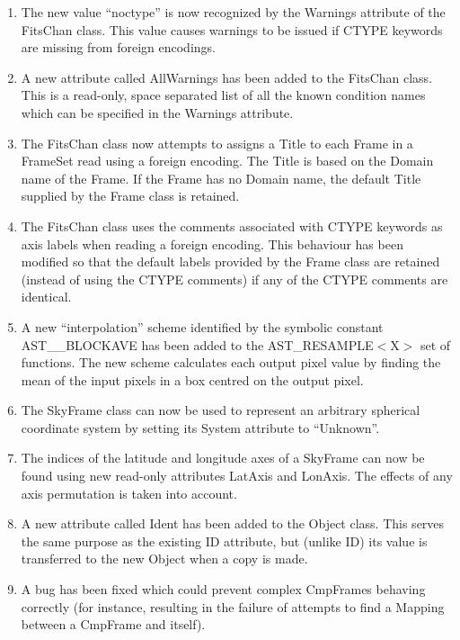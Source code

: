 \documentclass[twoside,11pt]{article}
\begin{document}
\begin{enumerate}
\item The new value ``noctype'' is now recognized by the Warnings attribute 
of the FitsChan class. This value causes warnings to be issued if CTYPE
keywords are missing from foreign encodings.

\item A new attribute called AllWarnings has been added to the FitsChan 
class. This is a read-only, space separated list of all the known condition 
names which can be specified in the Warnings attribute.

\item The FitsChan class now attempts to assigns a Title to each Frame in
a FrameSet read using a foreign encoding. The Title is based on the Domain
name of the Frame. If the Frame has no Domain name, the default Title
supplied by the Frame class is retained.

\item The FitsChan class uses the comments associated with CTYPE
keywords as axis labels when reading a foreign encoding. This behaviour 
has been modified so that the default labels provided by the Frame class
are retained (instead of using the CTYPE comments) if any of the CTYPE 
comments are identical.

\item A new ``interpolation'' scheme identified by the symbolic constant
AST\_\_BLOCKAVE has been added to the AST\_RESAMPLE$<$X$>$ set of
functions. The new scheme calculates each output pixel value by finding
the mean of the input pixels in a box centred on the output pixel.

\item The SkyFrame class can now be used to represent an arbitrary spherical
coordinate system by setting its System attribute to ``Unknown''.

\item The indices of the latitude and longitude axes of a SkyFrame can
now be found using new read-only attributes LatAxis and LonAxis. The
effects of any axis permutation is taken into account.

\item A new attribute called Ident has been added to the Object class.
This serves the same purpose as the existing ID attribute, but (unlike ID)
its value is transferred to the new Object when a copy is made.

\item A bug has been fixed which could prevent complex CmpFrames
behaving correctly (for instance, resulting in the failure of attempts 
to find a Mapping between a CmpFrame and itself).

\end{enumerate}
\end{document}
